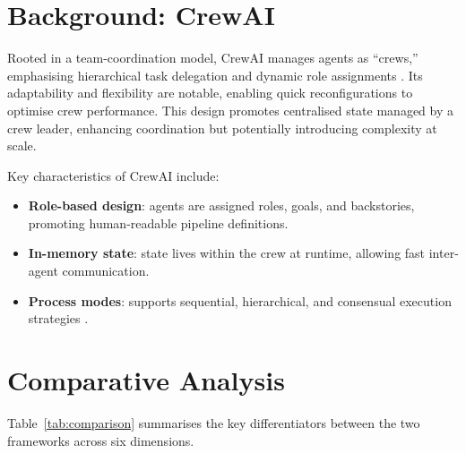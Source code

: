 \documentclass[12pt,a4paper]{article}
\begin{document}
\section{Background: CrewAI}

Rooted in a team-coordination model, CrewAI manages agents as ``crews,''
emphasising hierarchical task delegation and dynamic role assignments
\cite{Doe2022CrewAI}. Its adaptability and flexibility are notable, enabling
quick reconfigurations to optimise crew performance. This design promotes
centralised state managed by a crew leader, enhancing coordination but
potentially introducing complexity at scale.

Key characteristics of CrewAI include:
\begin{itemize}
    \item \textbf{Role-based design}: agents are assigned roles, goals, and
          backstories, promoting human-readable pipeline definitions.
    \item \textbf{In-memory state}: state lives within the crew at runtime,
          allowing fast inter-agent communication.
    \item \textbf{Process modes}: supports sequential, hierarchical, and
          consensual execution strategies \cite{CrewAI2023Docs}.
\end{itemize}

\section{Comparative Analysis}

Table~\ref{tab:comparison} summarises the key differentiators between the two
frameworks across six dimensions.
\end{document}

